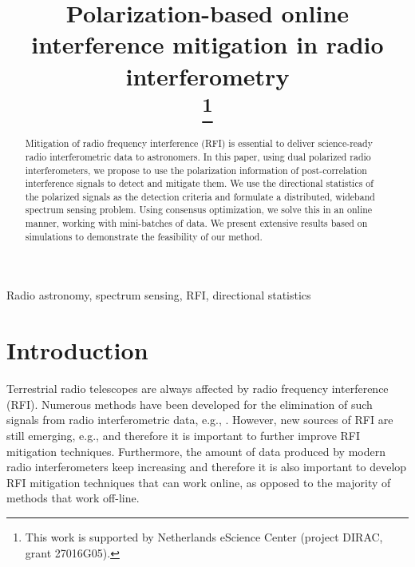 \documentclass[conference]{IEEEtran}
\begin{document}
\title{Polarization-based online interference mitigation in radio interferometry\\
\thanks{This work is supported by Netherlands eScience Center (project DIRAC, grant 27016G05).}
}

\author{
}

\maketitle

\begin{abstract}
Mitigation of radio frequency interference (RFI)  is essential to deliver science-ready radio interferometric data to astronomers. In this paper, using dual polarized radio interferometers, we propose to use the polarization information of  post-correlation interference signals to detect and mitigate them. We use the directional statistics of the polarized signals as the detection criteria and formulate a distributed, wideband spectrum sensing problem. Using consensus optimization, we solve this in an online manner, working with mini-batches of data. We present extensive results based on simulations to demonstrate the feasibility of our method.
\end{abstract}

\begin{IEEEkeywords}
Radio astronomy, spectrum sensing, RFI, directional statistics
\end{IEEEkeywords}

\section{Introduction}
Terrestrial radio telescopes are always affected by radio frequency interference (RFI). Numerous methods have been developed for the elimination of such signals from radio interferometric data, e.g., \cite{Leshem_2000,Leshem_2000A,Fridman,raza2002spatial,Bentum2008,aoflagger,Baan2019,Cucho2019,Vos2019}. However, new sources of RFI are still emerging, e.g., \cite{Brentjens2016,Winkel2019,Soko2016}  and therefore it is important to further improve RFI mitigation techniques. Furthermore, the amount of data produced by modern radio interferometers keep increasing and therefore it is also important to develop RFI mitigation techniques that can work online, as opposed to the majority of methods that work off-line.
\end{document}

